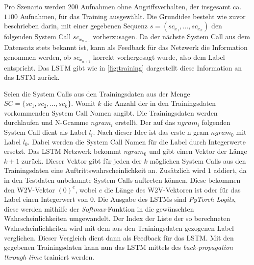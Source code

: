             Pro Szenario werden $200$ Aufnahmen ohne Angriffsverhalten, der insgesamt ca.\ $1100$ Aufnahmen, für das Training ausgewählt.
            Die Grund\-idee besteht wie zuvor beschrieben darin, mit einer gegebenen Sequenz $s = (sc_{x_1},\dots,sc_{x_n})$ den folgenden System Call $sc_{x_{n+1}}$ vorherzusagen. 
            Da der nächste System Call aus dem Datensatz stets bekannt ist, kann als Feedback für das Netzwerk die Information genommen werden, ob $sc_{x_{n+1}}$ korrekt vorhergesagt wurde, also dem Label entspricht.
            Das \ac{LSTM} gibt wie in \autoref{fig:training} dargestellt diese Information an das \ac{LSTM} zurück.

            Seien die System Calls aus den Trainingsdaten aus der Menge $SC = \{sc_1,sc_2,\dots,sc_k\}$.
            Womit $k$ die Anzahl der in den Trainingsdaten vorkommenden System Call Namen angibt.
            Die Trainingsdaten werden durchlaufen und N-Gramme $ngram_i$ erstellt.
            Der auf das $ngram_i$ folgenden System Call dient als Label $l_i$.
            Nach dieser Idee ist das erste n-gram $ngram_0$ mit Label $l_0$.
            Dabei werden die System Call Namen für die Label durch Integerwerte ersetzt. 
            Das \ac{LSTM} Netzwerk bekommt $ngram_0$ und gibt einen Vektor der Länge $k+1$ zurück.
            Dieser Vektor gibt für jeden der $k$ möglichen System Calls aus den Trainingsdaten eine Auftrittswahrscheinlichkeit an.
            Zusätzlich wird $1$ addiert, da in den Testdaten unbekannte System Calls auftreten können.
            Diese bekommen den \ac{W2V}-Vektor $(0)^e$, wobei $e$ die Länge des \ac{W2V}-Vektoren ist oder für das Label einen Integerwert von $0$. 
            Die Ausgabe des \acp{LSTM} sind \textit{PyTorch Logits}, diese werden mithilfe der \textit{Softmax}-Funktion in die gewünschten Wahrscheinlichkeiten umgewandelt.
            Der Index der Liste der so berechneten Wahrscheinlichkeiten wird mit dem aus den Trainingsdaten gezogenen Label verglichen.
            Dieser Vergleich dient dann als Feedback für das \ac{LSTM}.
            Mit den gegebenen Trainingsdaten kann nun das \ac{LSTM} mittels des \textit{back-propagation through time}  trainiert werden.

